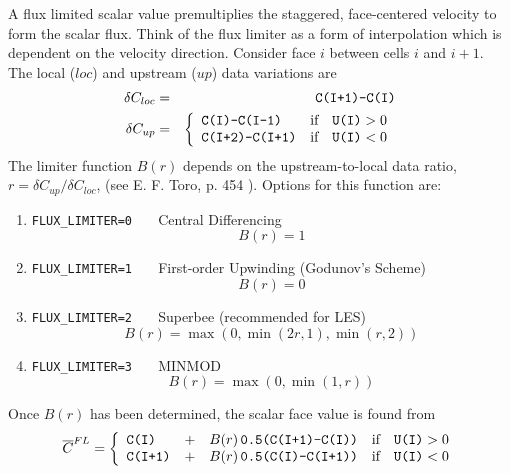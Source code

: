 \documentclass[11pt]{article}
\begin{document}
A flux limited scalar value premultiplies the staggered, face-centered velocity to form the scalar flux.  Think of the flux limiter as a form of interpolation which is dependent on the velocity direction. Consider face $i$ between cells $i$ and $i+1$.  The local ($loc$) and upstream ($up$) data variations are
\begin{eqnarray}
\delta C_{loc} &=& \mbox{\tt C(I+1)-C(I)} \nonumber\\
\delta C_{up}  &=& \left\{ \begin{array}{ll} \mbox{\tt C(I)-C(I-1)} & \mbox{if} \quad \mbox{\tt U(I)}>0 \\ \mbox{\tt C(I+2)-C(I+1)} & \mbox{if} \quad \mbox{\tt U(I)}<0 \end{array} \right. \nonumber
\end{eqnarray}
The limiter function $B(r)$ depends on the upstream-to-local data ratio, $r=\delta C_{up}/\delta C_{loc}$, (see E. F. Toro, p. 454 \cite{Toro}).  Options for this function are:
\begin{enumerate}
\item[]{\tt FLUX\_LIMITER=0\,\,\,} Central Differencing  \begin{equation} B(r) = 1 \end{equation}
\item[]{\tt FLUX\_LIMITER=1\,\,\,} First-order Upwinding (Godunov's Scheme) \begin{equation} B(r) = 0 \end{equation}
\item[]{\tt FLUX\_LIMITER=2\,\,\,} Superbee (recommended for LES) \begin{equation} B(r) = \max(0,\min(2r,1),\min(r,2)) \end{equation}
\item[]{\tt FLUX\_LIMITER=3\,\,\,} MINMOD \begin{equation} B(r) = \max(0,\min(1,r)) \end{equation}
\end{enumerate}
Once $B(r)$ has been determined, the scalar face value is found from
\begin{equation}
\label{eqn_flux_limiter}
\overline{C}^{\tiny FL} = \left\{ \begin{array}{lcll} \mbox{\tt C(I)} &+& B(r) \,\mbox{\tt 0.5(C(I+1)-C(I))} & \mbox{if} \quad \mbox{\tt U(I)}>0 \\
\mbox{\tt C(I+1)} &+& B(r) \,\mbox{\tt 0.5(C(I)-C(I+1))} & \mbox{if} \quad \mbox{\tt U(I)}<0 \end{array} \right.
\end{equation}
\end{document}
